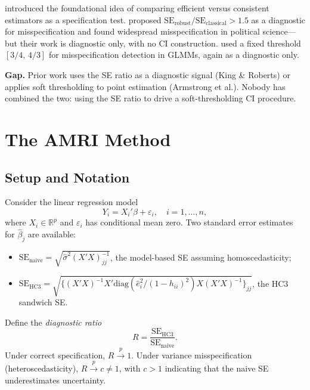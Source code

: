 \documentclass[12pt]{article}
\theoremstyle{definition}
\theoremstyle{remark}
\newcommand{\R}{\mathbb{R}}
\newcommand{\se}{\mathrm{SE}}
\newcommand{\plim}{\overset{p}{\to}}
\begin{document}
\citet{hausman1978specification} introduced the foundational idea of comparing efficient versus consistent estimators as a specification test. \citet{king2015robust} proposed $\se_{\mathrm{robust}}/\se_{\mathrm{classical}} > 1.5$ as a diagnostic for misspecification and found widespread misspecification in political science---but their work is diagnostic only, with no CI construction. \citet{chavance2016review} used a fixed threshold $[3/4,\, 4/3]$ for misspecification detection in GLMMs, again as a diagnostic only.

\textbf{Gap.} Prior work uses the SE ratio as a diagnostic signal (King \& Roberts) or applies soft thresholding to point estimation (Armstrong et al.). Nobody has combined the two: using the SE ratio to drive a soft-thresholding CI procedure.


\section{The AMRI Method}\label{sec:method}

\subsection{Setup and Notation}\label{sec:setup}

Consider the linear regression model
\begin{equation}\label{eq:model}
Y_i = X_i'\beta + \varepsilon_i, \quad i = 1, \ldots, n,
\end{equation}
where $X_i \in \R^p$ and $\varepsilon_i$ has conditional mean zero. Two standard error estimates for $\hat\beta_j$ are available:
\begin{itemize}[nosep]
\item $\se_{\mathrm{naive}} = \sqrt{\hat\sigma^2 (X'X)^{-1}_{jj}}$, the model-based SE assuming homoscedasticity;
\item $\se_{\mathrm{HC3}} = \sqrt{\{(X'X)^{-1} X' \mathrm{diag}(\hat{e}_i^2/(1-h_{ii})^2) X (X'X)^{-1}\}_{jj}}$, the HC3 sandwich SE.
\end{itemize}

Define the \emph{diagnostic ratio}
\begin{equation}\label{eq:ratio}
R = \frac{\se_{\mathrm{HC3}}}{\se_{\mathrm{naive}}}.
\end{equation}
Under correct specification, $R \plim 1$. Under variance misspecification (heteroscedasticity), $R \plim c \neq 1$, with $c > 1$ indicating that the naive SE underestimates uncertainty.
\end{document}
